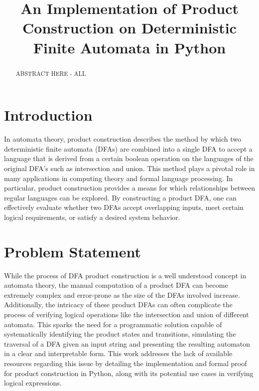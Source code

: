 \documentclass[conference]{IEEEtran}
\begin{document}
\title{An Implementation of Product Construction on Deterministic Finite Automata in Python}

\author{
\and
{}
\and
{}
}

\maketitle

\begin{abstract}
ABSTRACT HERE - ALL
\end{abstract}

\section{Introduction}
In automata theory, product construction describes the method by which two deterministic finite automata (DFAs) are combined into a single DFA to accept a language that is derived from a certain boolean operation on the languages of the original DFA's such as intersection and union. This method plays a pivotal role in many applications in computing theory and formal language processing. In particular, product construction provides a means for which relationships between regular languages can be explored. By constructing a product DFA, one can effectively evaluate whether two DFAs accept overlapping inputs, meet certain logical requirements, or satisfy a desired system behavior.
\section{Problem Statement}
While the process of DFA product construction is a well understood concept in automata theory, the manual computation of a product DFA can become extremely complex and error-prone as the size of the DFAs involved increase. Additionally, the intricacy of these product DFAs can often complicate the process of verifying logical operations like the intersection and union of different automata. This sparks the need for a programmatic solution capable of systematically identifying the product states and transitions, simulating the traversal of a DFA given an input string and presenting the resulting automaton in a clear and interpretable form. This work addresses the lack of available resources regarding this issue by detailing the implementation and formal proof for product construction in Python, along with its potential use cases in verifying logical expressions.
\end{document}
